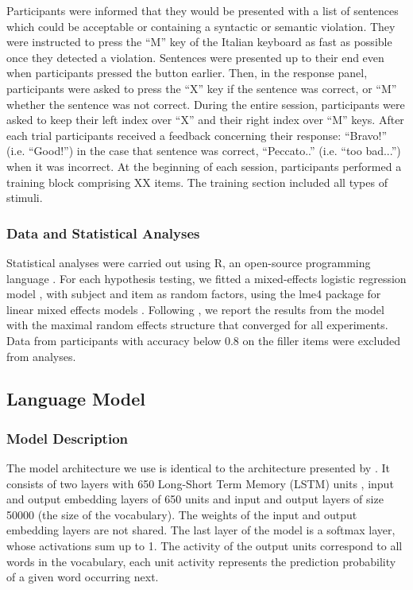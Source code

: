 Participants were informed that they would be presented with a list of sentences which could be acceptable or containing a syntactic or semantic violation. They were instructed to press the “M” key of the Italian keyboard as fast as possible once they detected a violation. Sentences were presented up to their end even when participants pressed the button earlier. Then, in the response panel, participants were asked to press the “X” key if the sentence was correct, or “M” whether the sentence was not correct. During the entire session, participants were asked to keep their left index over “X” and their right index over “M” keys. After each trial participants received a feedback concerning their response: ``Bravo!'' (i.e. ``Good!'') in the case that sentence was correct, ``Peccato..'' (i.e. ``too bad...'') when it was incorrect. At the beginning of each session, participants performed a training block comprising XX items. The training section included all types of stimuli.

\subsubsection{Data and Statistical Analyses}
Statistical analyses were carried out using R, an open-source programming language \citep{R}. For each hypothesis testing, we fitted a mixed-effects logistic regression model \citep{Jaeger2008}, with subject and item as random factors, using the lme4 package for linear mixed effects models \citep{Bates}. Following \citet{Baayen:etal:2008}, we report the results from the model with the maximal random effects structure that converged for all experiments. Data from participants with accuracy below 0.8 on the filler items were excluded from analyses.

\subsection{Language Model}
\subsubsection{Model Description}
The model architecture we use is identical to the architecture presented by \citet{Gulordava:etal:2018}. 
It consists of two layers with 650 Long-Short Term Memory (LSTM) units \citep{Hochreiter:Schmidhuber:1997}, input and output embedding layers of 650 units and input and output layers of size 50000 (the size of the vocabulary). The weights of the input and output embedding layers are not shared.
The last layer of the model is a softmax layer, whose activations sum up to 1. The activity of the output units correspond to all words in the vocabulary, each unit activity represents the prediction probability of a given word occurring next. 

